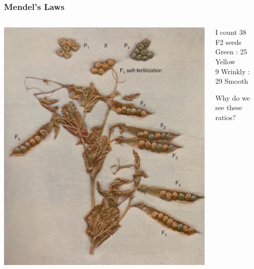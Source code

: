\documentclass{beamer}
\begin{document}
\begin{frame}
	
	\frametitle{Mendel's Laws}
	\begin{columns}
		\begin{column}{0.6\textwidth}
			\includegraphics[keepaspectratio, width  =\textwidth]{img/crossedPeas}
			
		\end{column}
		\begin{column}{0.4\textwidth}
			\small	
		I count 38 F2 seeds \\
		 Green : 25 Yellow\\
		
		9 Wrinkly : 29 Smooth
		
			\vspace{10pt}
		Why do we see these ratios?
			
		\end{column}		
		
	\end{columns}
\end{frame}
\end{document}
